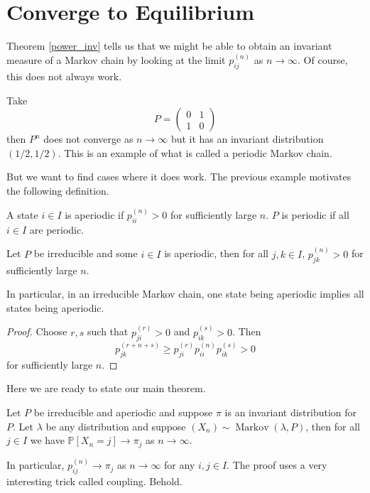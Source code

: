 \section{Converge to Equilibrium}
Theorem \ref{power_inv} tells us that we might be able to obtain an invariant measure of a Markov chain by looking at the limit $p_{ij}^{(n)}$ as $n\to\infty$.
Of course, this does not always work.
\begin{example}
    Take
    $$P=\begin{pmatrix}
        0&1\\
        1&0
    \end{pmatrix}$$
    then $P^n$ does not converge as $n\to\infty$ but it has an invariant distribution $(1/2,1/2)$.
    This is an example of what is called a periodic Markov chain.
\end{example}
But we want to find cases where it does work.
The previous example motivates the following definition.
\begin{definition}
    A state $i\in I$ is aperiodic if $p_{ii}^{(n)}>0$ for sufficiently large $n$.
    $P$ is periodic if all $i\in I$ are periodic.
\end{definition}
\begin{lemma}
    Let $P$ be irreducible and some $i\in I$ is aperiodic, then for all $j,k\in I$, $p_{jk}^{(n)}>0$ for sufficiently large $n$.
\end{lemma}
In particular, in an irreducible Markov chain, one state being aperiodic implies all states being aperiodic.
\begin{proof}
    Choose $r,s$ such that $p_{ji}^{(r)}>0$ and $p_{ik}^{(s)}>0$.
    Then
    $$p_{jk}^{(r+n+s)}\ge p_{ji}^{(r)}p_{ii}^{(n)}p_{ik}^{(s)}>0$$
    for sufficiently large $n$.
\end{proof}
Here we are ready to state our main theorem.
\begin{theorem}\label{aperiodic_conv}
    Let $P$ be irreducible and aperiodic and suppose $\pi$ is an invariant distribution for $P$.
    Let $\lambda$ be any distribution and suppose $(X_n)\sim\operatorname{Markov}(\lambda,P)$, then for all $j\in I$ we have $\mathbb P[X_n=j]\to\pi_j$ as $n\to\infty$.
\end{theorem}
In particular, $p_{ij}^{(n)}\to\pi_j$ as $n\to\infty$ for any $i,j\in I$.
The proof uses a very interesting trick called coupling.
Behold.
